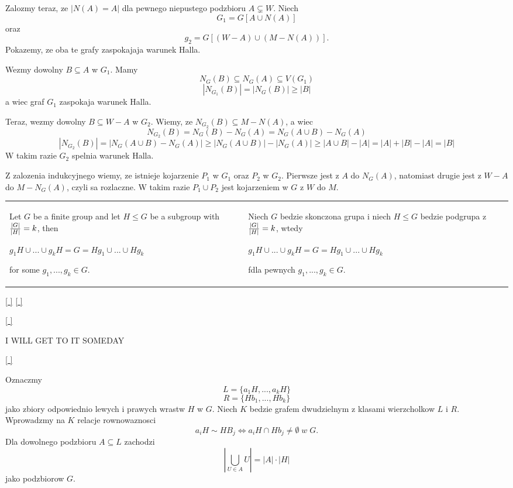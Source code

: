 Zalozmy teraz, ze $|N(A)=A|$ dla pewnego niepustego podzbioru $A\subsetneq W$. Niech
$$G_1=G[A\cup N(A)]$$ 
oraz 
$$g_2=G[(W-A)\cup(M-N(A))].$$
Pokazemy, ze oba te grafy zaspokajaja warunek Halla.

Wezmy dowolny $B\subseteq A$ w $G_1$. Mamy
$$N_G(B)\subseteq N_G(A)\subseteq V(G_1)$$
$$|N_{G_1}(B)|=|N_G(B)|\geq|B|$$
a wiec graf $G_1$ zaspokaja warunek Halla.

Teraz, wezmy dowolny $B\subseteq W-A$ w $G_2$. Wiemy, ze $N_{G_2}(B)\subseteq M-N(A)$, a wiec
$$N_{G_2}(B)= N_G(B)-N_G(A)=N_G(A\cup B)-N_G(A)$$
$$|N_{G_2}(B)|=|N_G(A\cup B)-N_G(A)|\geq |N_G(A\cup B)|-|N_G(A)|\geq |A\cup B|-|A|=|A|+|B|-|A|=|B|$$
W takim razie $G_2$ spelnia warunek Halla.
\smallskip

Z zalozenia indukcyjnego wiemy, ze istnieje kojarzenie $P_1$ w $G_1$ oraz $P_2$ w $G_2$. Pierwsze jest z $A$ do $N_G(A)$, natomiast drugie jest z $W-A$ do $M-N_G(A)$, czyli sa rozlaczne. W takim razie $P_1\cup P_2$ jest kojarzeniem w $G$ z $W$ do $M$.
\bigskip

\bigskip

\begin{tabularx}{\textwidth}{ X!{\color{git90gray}\vrule} X}

    Let $G$ be a finite group and let $H\leq G$ be a subgroup with ${|G|\over|H|}=k$, then

    $g_1H\cup ...\cup g_kH=G=Hg_1\cup...\cup Hg_k$

    for some $g_1,...,g_k\in G$.

    &

    Niech $G$ bedzie skonczona grupa i niech $H\leq G$ bedzie podgrupa z ${|G|\over|H|}=k$, wtedy


    $g_1H\cup ...\cup g_kH=G=Hg_1\cup...\cup Hg_k$
    
    fdla pewnych $g_1,...,g_k\in G$.

\end{tabularx}

\hyperref[cosets-graphs-GB]{[ ]} \hyperref[cosets-graphs-PL]{[ ]}
\label{cosets-graphs-LAN}

\medskip

\hyperref[cosets-graphs-LAN]{[ ]}
\label{cosets-graphs-GB}
\medskip

{\color{cyan}I WILL GET TO IT SOMEDAY}

\hyperref[cosets-graphs-LAN]{[ ]}
\label{cosets-graphs-PL}
\medskip

Oznaczmy
$$L=\{a_1H,...,a_kH\}$$
$$R=\{Hb_1,...,Hb_k\}$$
jako zbiory odpowiednio lewych i prawych wrastw $H$ w $G$. Niech $K$ bedzie grafem dwudzielnym z klasami wierzcholkow $L$ i $R$. Wprowadzmy na $K$ relacje rownowaznosci
$$a_iH\sim HB_j\iff a_iH\cap Hb_j\neq\emptyset\;w\;G.$$
Dla dowolnego podzbioru $A\subseteq L$ zachodzi
$$|\bigcup\limits_{U\in A}U|=|A|\cdot|H|$$
jako podzbiorow $G$.